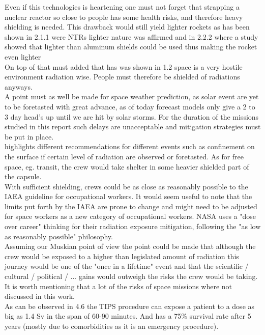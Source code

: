 \documentclass[12pt,a4paper]{report}
\begin{document}
Even if this technologies is heartening one must not forget that strapping a nuclear reactor so close to people has some health risks, and therefore heavy shielding is needed.
This drawback would still yield lighter rockets as has been shown in 2.1.1 were NTRs lighter nature was affirmed and in 2.2.2 where a study showed that lighter than aluminum shields could be used thus making the rocket even lighter\\

On top of that must added that has was shown in 1.2 space is a very hostile environment radiation wise. People must therefore be shielded of radiations anyways.\\

A point must as well be made for space weather prediction, as solar event are yet to be foretasted with great advance, as of today forecast models only give a 2 to 3 day head's up until we are hit by solar storms. For the duration of the missions studied in this report such delays are unacceptable and mitigation strategies must be put in place.\\
\citet{valinia2022safe} highlights different recommendations for different events such as confinement on the surface if certain level of radiation are observed or foretasted. As for free space, eg. transit, the crew would take shelter in some heavier shielded part of the capsule.\\
\newpage
With sufficient shielding, crews could be as close as reasonably possible to the IAEA guideline for occupational workers. It would seem useful to note that the limits put forth by the IAEA are prone to change and might need to be adjusted for space workers as a new category of occupational workers. NASA uses a "dose over career" thinking for their radiation exposure mitigation, following the "as low as reasonably possible" philosophy.\\

Assuming our Muskian point of view the point could be made that although the crew would be exposed to a higher than legislated amount of radiation this journey would be one of the "once in a lifetime" event and that the scientific / cultural / political / ... gains would outweigh the risks the crew would be taking. It is worth mentioning that a lot of the risks of space missions where not discussed in this work.\\
As can be observed in 4.6 the TIPS procedure can expose a patient to a dose as big as 1.4 Sv in the span of 60-90 minutes. And has a 75\% survival rate after 5 years (mostly due to comorbidities as it is an emergency procedure).\\
\end{document}
